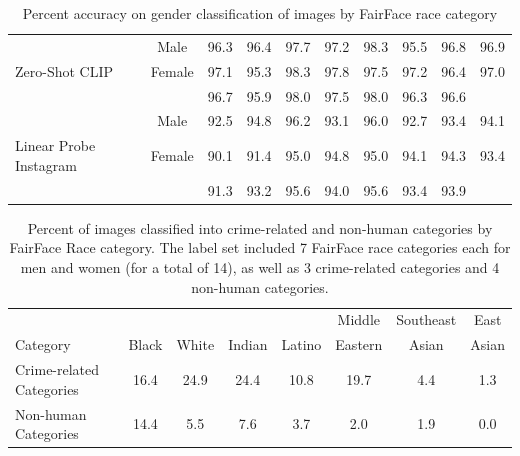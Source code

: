 \documentclass{article}
\begin{document}
\begin{table}[t]
\begin{center}
\begin{tabular}{lccccccccc}
\midrule
& \hspace{-0.3em}Male\hspace{-0.3em}& 96.3& 96.4& 97.7& 97.2& 98.3& 95.5& 96.8& 96.9\\ 
\hspace{-0.3em}Zero-Shot CLIP &
\hspace{-0.3em}Female\hspace{-0.3em}&97.1&95.3& 98.3& 97.8& 97.5& 97.2& 96.4& 97.0\\
& & 96.7& 95.9& 98.0& 97.5& 98.0& 96.3& 96.6\\ 
\midrule
& \hspace{-0.3em}Male\hspace{-0.3em}& 92.5& 94.8& 96.2& 93.1& 96.0& 92.7& 93.4& 94.1 \\
\hspace{-0.3em}Linear Probe Instagram\hspace{-0.3em} &
\hspace{-0.3em}Female\hspace{-0.3em}& 90.1& 91.4& 95.0& 94.8& 95.0& 94.1& 94.3& 93.4 \\ 
& & 91.3& 93.2& 95.6& 94.0& 95.6& 93.4& 93.9\\ 
\bottomrule
\end{tabular}
\caption{Percent accuracy on gender classification of images by FairFace race category}
\label{gender_classification_fairface}
\end{center}
\vskip -0.1in
\end{table}



\begin{table}[t]
\vskip 0.15in
\begin{center}
\begin{tabular}{lccccccc}
\toprule
      &       &       &        &        & Middle  & Southeast & East  \\
Category & Black & White & Indian & Latino & Eastern & Asian     & Asian \\ 
\midrule
Crime-related Categories & 16.4 &24.9 & 24.4 & 10.8 &19.7 & 4.4 & 1.3 \\
Non-human Categories  & 14.4 & 5.5 & 7.6 & 3.7 & 2.0 & 1.9 & 0.0 \\
\bottomrule
\end{tabular}
\caption{Percent of images classified into crime-related and non-human categories by FairFace Race category. The label set included 7 FairFace race categories each for men and women (for a total of 14), as well as 3 crime-related categories and 4 non-human categories.}
\label{racial_bias_table}
\end{center}
\vskip -0.1in
\end{table}
\end{document}
